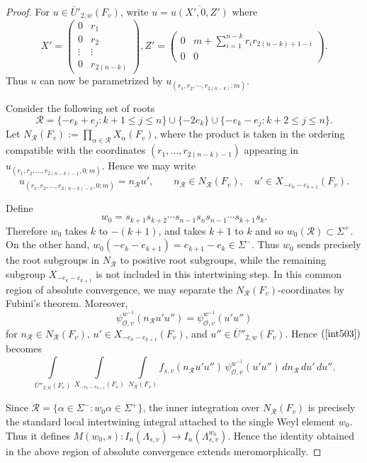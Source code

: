 \documentclass[11pt,notitlepage]{amsart}
\theoremstyle{definition}
\theoremstyle{remark}
\newcommand{\calO}{\mathcal{O}}
\begin{document}
\begin{proof}
For $u\in \overline{U}'_{2,w}(F_v)$, write $u=\overline{u(X',0,Z')}$ where \[X'=\begin{pmatrix}
    0&r_1\\
    0&r_2\\
    \vdots&\vdots\\
    0&r_{2(n-k)}
  \end{pmatrix},
Z'=\begin{pmatrix}
    0&m+\displaystyle\sum_{i=1}^{n-k}r_ir_{2(n-k)+1-i}\\0&0
  \end{pmatrix}.\]  
Thus $u$ can now be parametrized by $u_{(r_1,r_2,\cdots,r_{2(n-k)};m)}$.

Consider the following set of roots
\[
\mathcal R
=
\{ -e_k+e_j: k+1\le j\le n\}
\cup
\{-2e_k\}
\cup
\{ -e_k-e_j: k+2\le j\le n\}.
\]
Let $N_{\mathcal R}(F_v):=\prod_{\alpha\in\mathcal R}X_\alpha(F_v)$, where the product is taken in the ordering compatible with the coordinates $(r_1,\ldots,r_{2(n-k)-1})$ appearing in
$u_{(r_1,r_2,\ldots,r_{2(n-k)-1},0;m)}$. Hence we may write
\[
u_{(r_1,r_2,\ldots,r_{2(n-k)-1},0;m)}
=
n_{\mathcal R}u',
\qquad
n_{\mathcal R}\in N_{\mathcal R}(F_v),
\quad
u'\in X_{-e_k-e_{k+1}}(F_v).
\]

Define
\[
w_0
=
s_{k+1}s_{k+2}\cdots s_{n-1}s_n s_{n-1}\cdots s_{k+1}s_k.
\]
Therefore $w_0$ takes $k$ to $-(k+1)$, and takes $k+1$ to $k$ and so
$w_0(\mathcal R)\subset \Sigma^+$. On the other hand, $w_0(-e_k-e_{k+1})=e_{k+1}-e_k\in\Sigma^-$. Thus \(w_0\) sends precisely the root subgroups in
\(N_{\mathcal R}\) to positive root subgroups, while the remaining subgroup
\(X_{-e_k-e_{k+1}}\) is not included in this intertwining step. In this common region of absolute convergence, we may
separate the \(N_{\mathcal R}(F_v)\)-coordinates by Fubini's theorem. Moreover,
\[
\psi^{w^{-1}}_{\calO,v}(n_{\mathcal R}u'u'')
=
\psi^{w^{-1}}_{\calO,v}(u'u'')
\]
for \(n_{\mathcal R}\in N_{\mathcal R}(F_v)\),
\(u'\in X_{-e_k-e_{k+1}}(F_v)\), and
\(u''\in \overline U''_{2,w}(F_v)\). Hence \((\ref{int503})\) becomes
\begin{equation}\label{int504}
  \int\limits_{\overline{U}''_{2,w}(F_v)}
  \int\limits_{X_{-e_k-e_{k+1}}(F_v)}
  \int\limits_{N_{\mathcal R}(F_v)}
  f_{s,v}(n_{\mathcal R}u'u'')\,
  \psi^{w^{-1}}_{\calO,v}(u'u'')\,
  dn_{\mathcal R}\,du'\,du''.
\end{equation}

Since
$\mathcal R=\{\alpha\in\Sigma^-:w_0\alpha\in\Sigma^+\}$, the inner integration over \(N_{\mathcal R}(F_v)\) is precisely the standard
local intertwining integral attached to the single Weyl element \(w_0\).
Thus it defines $M(w_0,s): I_n(\Lambda_{s,v})
\longrightarrow I_n(\Lambda_{s,v}^{w_0})$. Hence the identity obtained in the above region of
absolute convergence extends meromorphically.


\end{proof}
\end{document}
